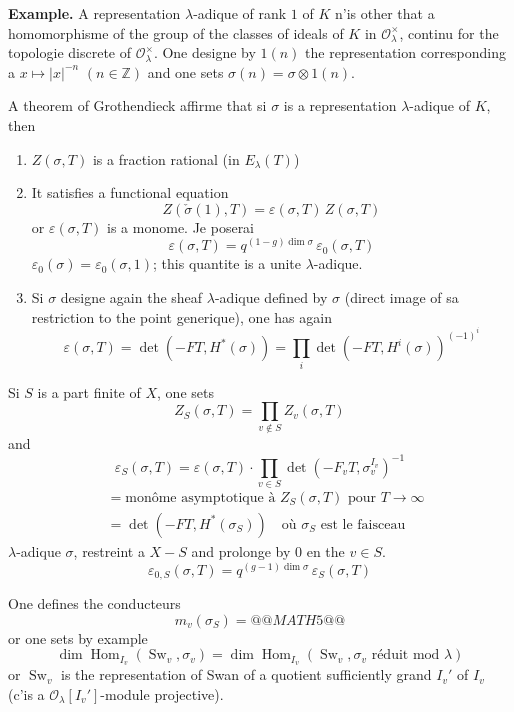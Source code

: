 \documentclass[11pt,a4paper]{article}
\theoremstyle{plain}
\DeclareMathOperator{\Hom}{Hom}
\DeclareMathOperator{\Sw}{Sw}
\begin{document}
\noindent\textbf{Example.} A representation $\lambda$-adique of rank $1$ of $K$ n'is other that a homomorphisme of the group of the classes of ideals of $K$ in $\mathcal{O}_\lambda^\times$, continu for the topologie discrete of $\mathcal{O}_\lambda^\times$. One designe by $1(n)$ the representation corresponding a $x \mapsto |x|^{-n}$ $(n \in \mathbb{Z})$ and one sets $\sigma(n) = \sigma \otimes 1(n)$.

A theorem of Grothendieck affirme that si $\sigma$ is a representation $\lambda$-adique of $K$, then

\begin{enumerate}[label=\alph*)]
\item $Z(\sigma, T)$ is a fraction rational (in $E_\lambda(T)$)
\item It satisfies a functional equation
\[
Z(\check{\sigma}(1), T) = \varepsilon(\sigma, T) \, Z(\sigma, T)
\]
or $\varepsilon(\sigma, T)$ is a monome. Je poserai
\[
\varepsilon(\sigma, T) = q^{(1-g)\dim \sigma} \, \varepsilon_0(\sigma, T)
\]
$\varepsilon_0(\sigma) = \varepsilon_0(\sigma, 1)$; this quantite is a unite $\lambda$-adique.
\item Si $\sigma$ designe again the sheaf $\lambda$-adique defined by $\sigma$ (direct image of sa restriction to the point generique), one has again
\[
\varepsilon(\sigma, T) = \det(-FT, H^*(\sigma)) = \prod_i \det(-FT, H^i(\sigma))^{(-1)^i}
\]
\end{enumerate}

\newpage

Si $S$ is a part finite of $X$, one sets
\[
Z_S(\sigma, T) = \prod_{v \notin S} Z_v(\sigma, T)
\]
and
\[
\varepsilon_S(\sigma, T) = \varepsilon(\sigma, T) \cdot \prod_{v \in S} \det(-F_v T, \sigma_v^{I_v})^{-1}
\]
\begin{align*}
&= \text{mon\^ome asymptotique \`a } Z_S(\sigma, T) \text{ pour } T \to \infty \\
&= \det(-FT, H^*(\sigma_S)) \quad \text{o\`u } \sigma_S \text{ est le faisceau}
\end{align*}
$\lambda$-adique $\sigma$, restreint a $X - S$ and prolonge by $0$ en the $v \in S$.
\[
\varepsilon_{0,S}(\sigma, T) = q^{(g-1)\dim \sigma} \, \varepsilon_S(\sigma, T)
\]

One defines the conducteurs
\[
m_v(\sigma_S) = @@MATH5@@
\]
or one sets by example
\[
\dim \Hom_{I_v}(\Sw_v, \sigma_v) = \dim \Hom_{I_v}(\Sw_v, \sigma_v \text{ r\'eduit mod } \lambda)
\]
or $\Sw_v$ is the representation of Swan of a quotient sufficiently grand $I_v'$ of $I_v$ (c'is a $\mathcal{O}_\lambda[I_v']$-module projective).
\end{document}
